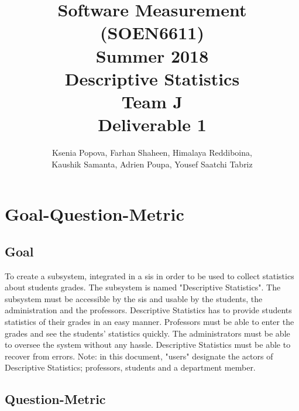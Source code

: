 \documentclass[11pt]{article}
\begin{document}
\title{Software Measurement (SOEN6611)\\Summer 2018\\Descriptive Statistics\\Team J\\Deliverable 1}
\author{Ksenia Popova, Farhan Shaheen, Himalaya Reddiboina,\\Kaushik Samanta, Adrien Poupa, Yousef Saatchi Tabriz}
\date{}
\maketitle

\newpage

\tableofcontents

\newpage
\section{Goal-Question-Metric}

\subsection{Goal}

To create a subsystem, integrated in a \gls{sis} in order to be used to collect statistics about students grades. The subsystem is named "Descriptive Statistics". The subsystem must be accessible by the \gls{sis} and usable by the students, the administration and the professors. Descriptive Statistics has to provide students statistics of their grades in an easy manner. Professors must be able to enter the grades and see the students' statistics quickly. The administrators must be able to oversee the system without any hassle. Descriptive Statistics must be able to recover from errors.
\newline
\newline
Note: in this document, "users" designate the actors of Descriptive Statistics; professors, students and a department member.

\subsection{Question-Metric}
\end{document}
